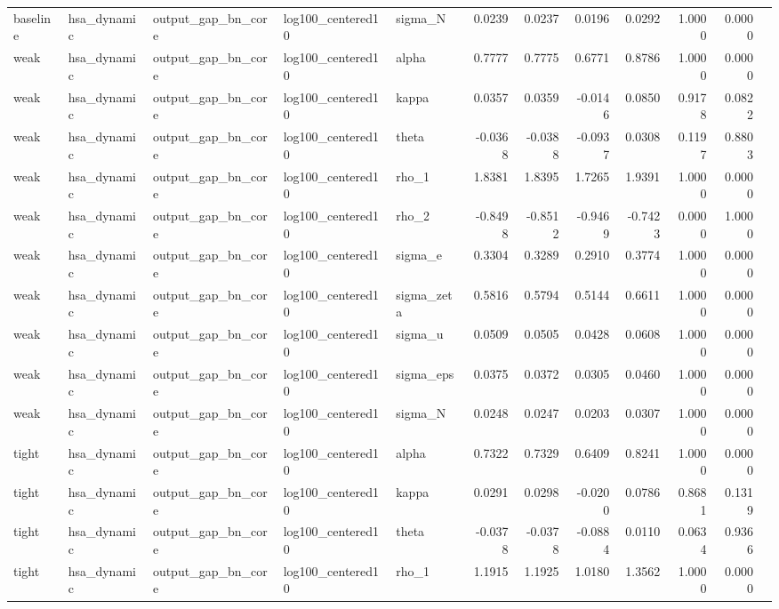 \begin{tabular}{lllllrrrrrrl}
baseline & hsa\_dynamic & output\_gap\_bn\_core & log100\_centered10 & sigma\_N & 0.0239 & 0.0237 & 0.0196 & 0.0292 & 1.0000 & 0.0000 &  \\
weak & hsa\_dynamic & output\_gap\_bn\_core & log100\_centered10 & alpha & 0.7777 & 0.7775 & 0.6771 & 0.8786 & 1.0000 & 0.0000 &  \\
weak & hsa\_dynamic & output\_gap\_bn\_core & log100\_centered10 & kappa & 0.0357 & 0.0359 & -0.0146 & 0.0850 & 0.9178 & 0.0822 &  \\
weak & hsa\_dynamic & output\_gap\_bn\_core & log100\_centered10 & theta & -0.0368 & -0.0388 & -0.0937 & 0.0308 & 0.1197 & 0.8803 &  \\
weak & hsa\_dynamic & output\_gap\_bn\_core & log100\_centered10 & rho\_1 & 1.8381 & 1.8395 & 1.7265 & 1.9391 & 1.0000 & 0.0000 &  \\
weak & hsa\_dynamic & output\_gap\_bn\_core & log100\_centered10 & rho\_2 & -0.8498 & -0.8512 & -0.9469 & -0.7423 & 0.0000 & 1.0000 &  \\
weak & hsa\_dynamic & output\_gap\_bn\_core & log100\_centered10 & sigma\_e & 0.3304 & 0.3289 & 0.2910 & 0.3774 & 1.0000 & 0.0000 &  \\
weak & hsa\_dynamic & output\_gap\_bn\_core & log100\_centered10 & sigma\_zeta & 0.5816 & 0.5794 & 0.5144 & 0.6611 & 1.0000 & 0.0000 &  \\
weak & hsa\_dynamic & output\_gap\_bn\_core & log100\_centered10 & sigma\_u & 0.0509 & 0.0505 & 0.0428 & 0.0608 & 1.0000 & 0.0000 &  \\
weak & hsa\_dynamic & output\_gap\_bn\_core & log100\_centered10 & sigma\_eps & 0.0375 & 0.0372 & 0.0305 & 0.0460 & 1.0000 & 0.0000 &  \\
weak & hsa\_dynamic & output\_gap\_bn\_core & log100\_centered10 & sigma\_N & 0.0248 & 0.0247 & 0.0203 & 0.0307 & 1.0000 & 0.0000 &  \\
tight & hsa\_dynamic & output\_gap\_bn\_core & log100\_centered10 & alpha & 0.7322 & 0.7329 & 0.6409 & 0.8241 & 1.0000 & 0.0000 &  \\
tight & hsa\_dynamic & output\_gap\_bn\_core & log100\_centered10 & kappa & 0.0291 & 0.0298 & -0.0200 & 0.0786 & 0.8681 & 0.1319 &  \\
tight & hsa\_dynamic & output\_gap\_bn\_core & log100\_centered10 & theta & -0.0378 & -0.0378 & -0.0884 & 0.0110 & 0.0634 & 0.9366 &  \\
tight & hsa\_dynamic & output\_gap\_bn\_core & log100\_centered10 & rho\_1 & 1.1915 & 1.1925 & 1.0180 & 1.3562 & 1.0000 & 0.0000 &  \\

\end{tabular}

